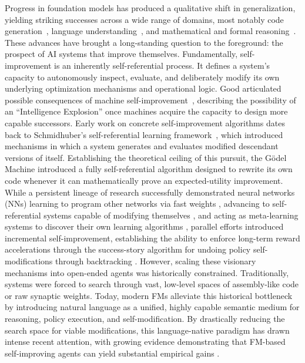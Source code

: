 Progress in foundation models has produced a qualitative shift in generalization, yielding striking successes across a wide range of domains, most notably code generation~\citep{chen2021evaluating}, language understanding~\citep{hendrycks2020measuring}, and mathematical and formal reasoning~\citep{wei2022chain}. These advances have brought a long-standing question to the foreground: the prospect of AI systems that improve themselves. Fundamentally, self-improvement is an inherently self-referential process. It defines a system's capacity to autonomously inspect, evaluate, and deliberately modify its own underlying optimization mechanisms and operational logic. Good articulated possible consequences of machine self-improvement~\citep{good1966speculations}, describing the possibility of an ``Intelligence Explosion'' once machines acquire the capacity to design more capable successors. Early work on concrete self-improvement algorithms dates back to Schmidhuber's self-referential learning framework~\citep{schmidhuber1987selfreferential}, which introduced mechanisms in which a system generates and evaluates modified descendant versions of itself. Establishing the theoretical ceiling of this pursuit, the G\"odel Machine \citep{schmidhuber2003godel} introduced a fully self-referential algorithm designed to rewrite its own code whenever it can mathematically prove an expected-utility improvement. While a persistent lineage of research successfully demonstrated neural networks (NNs) learning to program other networks via fast weights \citep{schmidhuber1992learning}, advancing to self-referential systems capable of modifying themselves \citep{schmidhuber1993self, irie2022modern}, and acting as meta-learning systems to discover their own learning algorithms \citep{hochreiter2001learning, schmidhuber2004optimal, kirsch2021meta, kirsch2022eliminating, irie2025metalearningcontinuallearningalgorithms}, parallel efforts introduced incremental self-improvement, establishing the ability to enforce long-term reward accelerations through the success-story algorithm for undoing policy self-modifications through backtracking \citep{Schmidhuber1994OnLH, schmidhuber1996simple, schmidhuber1997shifting}. However, scaling these visionary mechanisms into open-ended agents was historically constrained. Traditionally, systems were forced to search through vast, low-level spaces of assembly-like code or raw synaptic weights. Today, modern FMs alleviate this historical bottleneck by introducing natural language as a unified, highly capable semantic medium for reasoning, policy execution, and self-modification. By drastically reducing the search space for viable modifications, this language-native paradigm has drawn intense recent attention, with growing evidence demonstrating that FM-based self-improving agents can yield substantial empirical gains \citep{yuan2024self, acikgoz2025selfimprovingllmagentstesttime, qi2025webrl, zhang2025darwingodelmachineopenended}.


